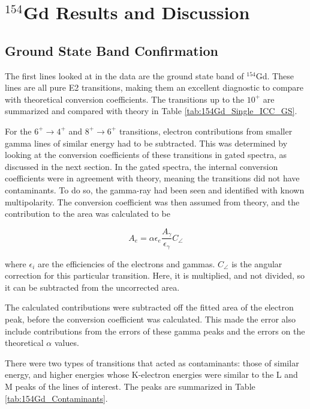 \chapter{$^{154}$Gd Results and Discussion}

\section{Ground State Band Confirmation}
\label{sec:154GS_Confirm}

The first lines looked at in the data are the ground state band of $^{154}$Gd. These lines are all pure E2 transitions, making them an excellent diagnostic to compare with theoretical conversion coefficients. The transitions up to the $10^+$ are summarized and compared with theory in Table \ref{tab:154Gd_Single_ICC_GS}.

For the $6^+\rightarrow 4^+$ and $8^+\rightarrow 6^+$ transitions, electron contributions from smaller gamma lines of similar energy had to be subtracted. This was determined by looking at the conversion coefficients of these transitions in gated spectra, as discussed in the next section. In the gated spectra, the internal conversion coefficients were in agreement with theory, meaning the transitions did not have contaminants. To do so, the gamma-ray had been seen and identified with known multipolarity. The conversion coefficient was then assumed from theory, and the contribution to the area was calculated to be

\begin{equation}
    \label{eq:ICC_Subtract}
    A_{e} = \alpha \epsilon_{e} \frac{A_{\gamma}}{\epsilon_{\gamma}} C_{\angle}
\end{equation}

where $\epsilon_{i}$ are the efficiencies of the electrons and gammas. $C_{\angle}$ is the angular correction for this particular transition. Here, it is multiplied, and not divided, so it can be subtracted from the uncorrected area.

The calculated contributions were subtracted off the fitted area of the electron peak, before the conversion coefficient was calculated. This made the error also include contributions from the errors of these gamma peaks and the errors on the theoretical $\alpha$ values. 

There were two types of transitions that acted as contaminants: those of similar energy, and higher energies whose K-electron energies were similar to the L and M peaks of the lines of interest. The peaks are summarized in Table \ref{tab:154Gd_Contaminants}.

